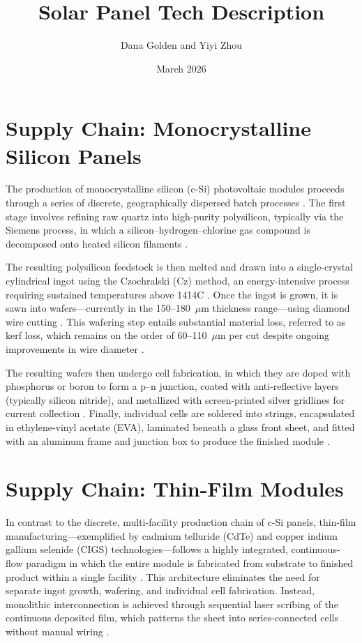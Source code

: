 \documentclass{article}
\title{Solar Panel Tech Description}
\author{Dana Golden and Yiyi Zhou}
\date{March 2026}
\begin{document}
\maketitle

\section{Supply Chain: Monocrystalline Silicon Panels}
 
The production of monocrystalline silicon (c-Si) photovoltaic modules proceeds through a series of discrete, geographically dispersed batch processes \citep{Powell2012, Woodhouse2019}. The first stage involves refining raw quartz into high-purity polysilicon, typically via the Siemens process, in which a silicon--hydrogen--chlorine gas compound is decomposed onto heated silicon filaments \citep{DOE_manufacturing}.

The resulting polysilicon feedstock is then melted and drawn into a single-crystal cylindrical ingot using the Czochralski (Cz) method, an energy-intensive process requiring sustained temperatures above 1414\textdegree{}C \citep{Czochralski1918, Costa2017}. Once the ingot is grown, it is sawn into wafers---currently in the 150--180~$\mu$m thickness range---using diamond wire cutting \citep{ITRPV2024}. This wafering step entails substantial material loss, referred to as kerf loss, which remains on the order of 60--110~$\mu$m per cut despite ongoing improvements in wire diameter \citep{ITRPV2024}.
 
The resulting wafers then undergo cell fabrication, in which they are doped with phosphorus or boron to form a p--n junction, coated with anti-reflective layers (typically silicon nitride), and metallized with screen-printed silver gridlines for current collection \citep{Powell2012, Woodhouse2019}. Finally, individual cells are soldered into strings, encapsulated in ethylene-vinyl acetate (EVA), laminated beneath a glass front sheet, and fitted with an aluminum frame and junction box to produce the finished module \citep{DOE_manufacturing}.
 
\section{Supply Chain: Thin-Film Modules}
 
In contrast to the discrete, multi-facility production chain of c-Si panels, thin-film manufacturing---exemplified by cadmium telluride (CdTe) and copper indium gallium selenide (CIGS) technologies---follows a highly integrated, continuous-flow paradigm in which the entire module is fabricated from substrate to finished product within a single facility \citep{DOE_manufacturing, Fthenakis2008}. This architecture eliminates the need for separate ingot growth, wafering, and individual cell fabrication. Instead, monolithic interconnection is achieved through sequential laser scribing of the continuous deposited film, which patterns the sheet into series-connected cells without manual wiring \citep{Amin2017}.
  
\end{document}
